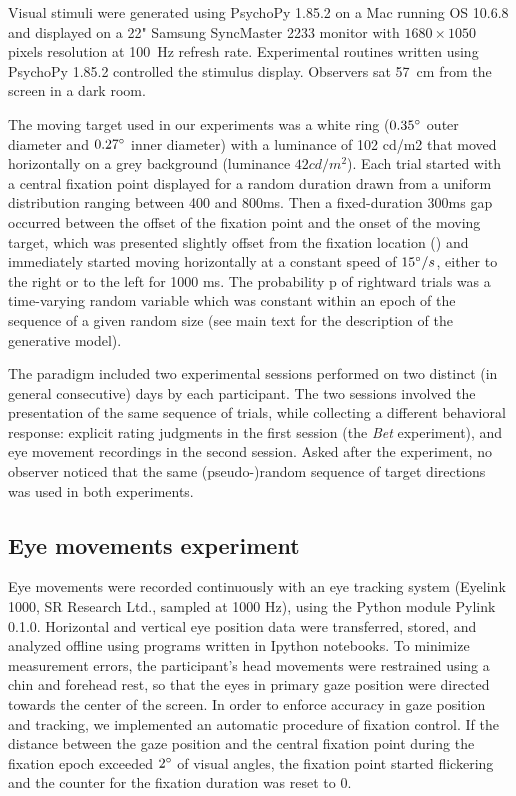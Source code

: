 \documentclass[12pt,english]{article}%
\newcommand{\citet}[1]{\textcite{#1}}
\begin{document}
Visual stimuli were generated using PsychoPy 1.85.2 on a Mac running OS 10.6.8 and displayed on a 22" Samsung SyncMaster 2233 monitor with $1680\times 1050$ pixels resolution at 100~\si{\Hz} refresh rate. Experimental routines written using PsychoPy 1.85.2 controlled the stimulus display. Observers sat 57~\si{\cm} from the screen in a dark room.

The moving target used in our experiments was a white ring ($0.35\degree$ outer diameter and $0.27\degree$ inner diameter) with a luminance of 102 cd/m2 that moved horizontally on a grey background (luminance $42cd/m^2$). Each trial started with a central fixation point displayed for a random duration drawn from a uniform distribution ranging between 400 and 800ms. Then a fixed-duration 300ms gap occurred between the offset of the fixation point and the onset of the moving target, which was presented slightly offset from the fixation location (\citet{Rashbass1961}) and immediately started moving horizontally at a constant speed of $15\degree/s$, either to the right or to the left for 1000 ms. The probability p of rightward trials was a time-varying random variable which was constant within an epoch of the sequence of a given random size (see main text for the description of the generative model).

The paradigm included two experimental sessions performed on two distinct (in general consecutive) days by each participant. The two sessions involved the presentation of the same sequence of trials, while collecting a different behavioral response: explicit rating judgments in the first session (the \textit{Bet} experiment), and eye movement recordings in the second session. Asked after the experiment, no observer noticed that the same (pseudo-)random sequence of target directions was used in both experiments.

\subsection{Eye movements experiment}
Eye movements were recorded continuously with an eye tracking system (Eyelink 1000, SR Research Ltd., sampled at 1000 Hz), using the Python module Pylink 0.1.0. Horizontal and vertical eye position data were transferred, stored, and analyzed offline using programs written in Ipython notebooks.
To minimize measurement errors, the participant's head movements were restrained using a chin and forehead rest, so that the eyes in primary gaze position were directed towards the center of the screen. In order to enforce accuracy in gaze position and tracking, we implemented an automatic procedure of fixation control. If the distance between the gaze position and the central fixation point during the fixation epoch exceeded $2\degree$ of visual angles, the fixation point started flickering and the counter for the fixation duration was reset to $0$.
\end{document}
